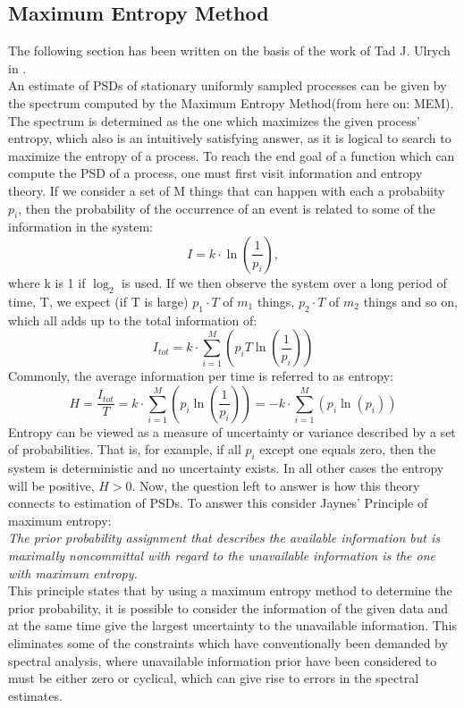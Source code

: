 \documentclass[11pt]{article}
\begin{document}
\subsection{Maximum Entropy Method}
The following section has been written on the basis of the work of Tad J. Ulrych in \cite{MEMSpectralAnalysis}.\\
An estimate of PSDs of stationary uniformly sampled processes can be given by the spectrum computed by the Maximum Entropy Method(from here on: MEM). The spectrum is determined as the one which maximizes the given process' entropy, which also is an intuitively satisfying answer, as it is logical to search to maximize the entropy of a process.
To reach the end goal of a function which can compute the PSD of a process, one must first visit information and entropy theory. 
If we consider a set of M things that can happen with each a probabiity $p_i$, then the probability of the occurrence of an event is related to some of the information in the system:
\begin{equation}
	I = k \cdot \ln(\frac{1}{p_i}),
\end{equation}
where k is 1 if $\log_2$ is used.
If we then observe the system over a long period of time, T, we expect (if T is large) $p_1\cdot T$ of $m_1$ things, $p_2\cdot T$ of $m_2$ things and so on, which all adds up to the total information of:
\begin{equation}
	I_{tot} = k \cdot \sum_{i = 1}^{M} (p_i T \ln(\frac{1}{p_i}))
\end{equation}
Commonly, the average information per time is referred to as entropy:
\begin{equation}
	H = \frac{I_{tot}}{T} = k \cdot \sum_{i = 1}^{M} (p_i \ln(\frac{1}{p_i})) = - k \cdot \sum_{i = 1}^{M} (p_i \ln(p_i)) 
\end{equation}
Entropy can be viewed as a measure of uncertainty or variance described by a set of probabilities. That is, for example, if all $p_i$ except one equals zero, then the system is deterministic and no uncertainty exists. In all other cases the entropy will be positive, $H > 0$. 
Now, the question left to answer is how this theory connects to estimation of PSDs. To answer this consider Jaynes' Principle of maximum entropy\cite{Jaynes}:\\
\textit{The prior probability assignment that describes the available information but is maximally noncommittal with regard to the unavailable information is the one with maximum entropy.}\\
This principle states that by using a maximum entropy method to determine the prior probability, it is possible to consider the information of the given data and at the same time give the largest uncertainty to the unavailable information. This eliminates some of the constraints which have conventionally been demanded by spectral analysis, where unavailable information prior have been considered to must be either zero or cyclical, which can give rise to errors in the spectral estimates.\\
\end{document}
